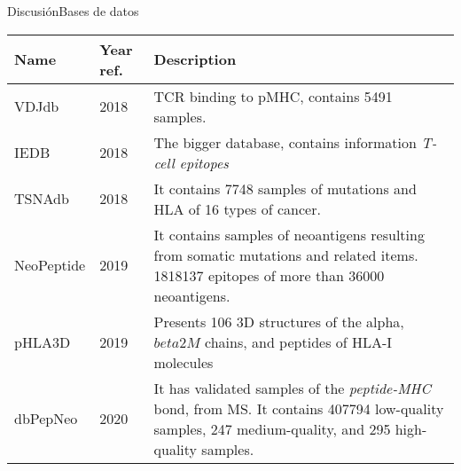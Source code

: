 \documentclass[10pt]{beamer}
\newcommand{\1}{
	\setbeamertemplate{background}{
		\texttt{[image: img/1]}
		\tikz[overlay] \fill[fill opacity=0.75,fill=white] (0,0) rectangle (-\paperwidth,\paperheight);
	}
}
\begin{document}
\begin{frame}{Discusión}{Bases de datos}
	
	\fontsize{7pt}{5pt}\selectfont
	
	\begin{table}[]
		\centering
				
		\setlength{\tabcolsep}{0.5em} %
		{\renewcommand{\arraystretch}{2}%
			\begin{tabular}{p{1.7cm}p{1.2cm}p{6.5cm}}
				\textbf{Name} & \textbf{Year ref.}                                                                & \textbf{Description}                                                                                                                                                                                      \\ \hline
				VDJdb           & 2018 \cite{shugay2018vdjdb}& TCR binding to pMHC, contains 5491 samples.                                                                                                                                           \\
				IEDB            & 2018 \cite{vita2019immune}                                           & The bigger database, contains information \textit{T-cell epitopes}                                                                                               \\
				TSNAdb          & 2018 \cite{wu2018tsnadb}                                             & It contains 7748 samples of mutations and HLA of 16 types of cancer.                                                                                                                           \\
				NeoPeptide      & 2019 \cite{zhou2019neopeptide}                                       & It contains samples of neoantigens resulting from somatic mutations and related items. 1818137 epitopes of more than 36000 neoantigens.
				\\
				pHLA3D          & 2019 \cite{e2019phla3d}                                              &
				Presents 106 3D structures of the alpha, $beta 2M$ chains, and peptides of HLA-I molecules                                                                                                            \\
				dbPepNeo        & 2020 \cite{tan2020dbpepneo}                                          & It has validated samples of the \textit{peptide-MHC} bond, from MS. It contains 407794 low-quality samples, 247 medium-quality, and 295 high-quality samples.

\end{tabular}}
\end{table}
\end{frame}
\end{document}
